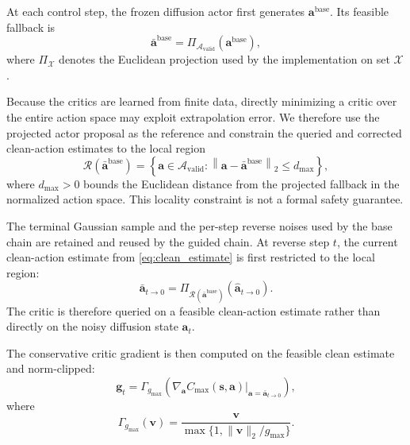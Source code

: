 \documentclass[9pt,journal]{IEEEtran}
\newcommand{\Avalid}{\mathcal{A}_{\mathrm{valid}}}
\newcommand{\va}{\bm{a}}
\newcommand{\vs}{\bm{s}}
\begin{document}
At each control step, the frozen diffusion actor first generates
$\va^{\mathrm{base}}$. Its feasible fallback is
\begin{equation*}
    \bar{\va}^{\mathrm{base}}
    =
    \Pi_{\Avalid}
    \left(
    \va^{\mathrm{base}}
    \right),
\end{equation*}
where $\Pi_{\mathcal X}$ denotes the Euclidean projection used by the
implementation on set $\mathcal X$.

Because the critics are learned from finite data, directly minimizing a
critic over the entire action space may exploit extrapolation error. We
therefore use the projected actor proposal as the reference and constrain
the queried and corrected clean-action estimates to the local region
\begin{equation}
    \mathcal R
    \left(
    \bar{\va}^{\mathrm{base}}
    \right)
    =
    \left\{
    \va\in\Avalid:
    \left\|
    \va-\bar{\va}^{\mathrm{base}}
    \right\|_2
    \leq d_{\max}
    \right\},
    \label{eq:query_region}
\end{equation}
where $d_{\max}>0$ bounds the Euclidean distance from
the projected fallback in the normalized action space.
This locality constraint is not a formal safety guarantee.

The terminal Gaussian sample and the per-step reverse noises used by
the base chain are retained and reused by the guided chain. At reverse
step $t$, the current clean-action estimate from
\eqref{eq:clean_estimate} is first restricted to the local region:
\begin{equation*}
    \bar{\va}_{t\rightarrow0}
    =
    \Pi_{\mathcal R(\bar{\va}^{\mathrm{base}})}
    \left(
    \widehat{\va}_{t\rightarrow0}
    \right).
\end{equation*}
The critic is therefore queried on a feasible clean-action estimate
rather than directly on the noisy diffusion state $\va_t$.

The conservative critic gradient is then computed on the feasible clean
estimate and norm-clipped:
\begin{equation}
    \bm g_t
    =
    \Gamma_{g_{\max}}
    \left(
    \left.
    \nabla_{\va}C_{\max}(\vs,\va)
    \right|_{\va=\bar{\va}_{t\rightarrow0}}
    \right),
    \label{eq:guidance_grad}
\end{equation}
where
\begin{equation*}
    \Gamma_{g_{\max}}(\bm v)
    =
    \frac{\bm v}
    {\max\{1,\|\bm v\|_2/g_{\max}\}}.
\end{equation*}
\end{document}
